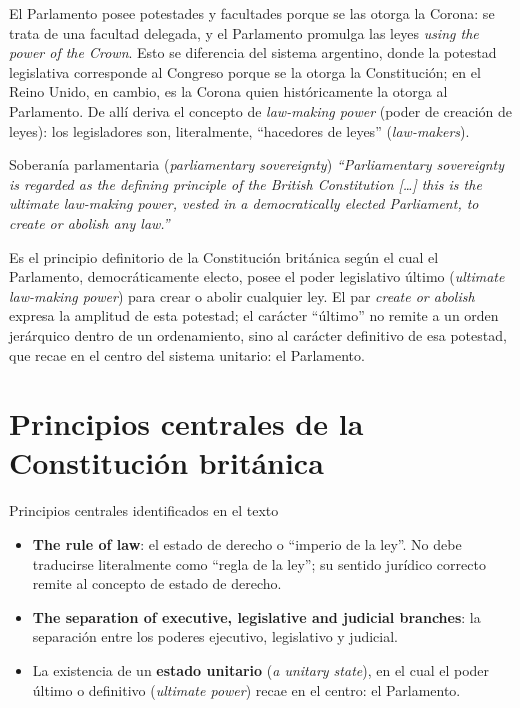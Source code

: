 \documentclass[12pt,oneside]{book}
\begin{document}
El Parlamento posee potestades y facultades porque se las otorga la Corona: se trata de una facultad delegada, y el Parlamento promulga las leyes \emph{using the power of the Crown}. Esto se diferencia del sistema argentino, donde la potestad legislativa corresponde al Congreso porque se la otorga la Constitución; en el Reino Unido, en cambio, es la Corona quien históricamente la otorga al Parlamento. De allí deriva el concepto de \emph{law-making power} (poder de creación de leyes): los legisladores son, literalmente, ``hacedores de leyes'' (\emph{law-makers}).

\begin{definition}{Soberanía parlamentaria (\emph{parliamentary sovereignty})}
\emph{``Parliamentary sovereignty is regarded as the defining principle of the British Constitution [\ldots] this is the ultimate law-making power, vested in a democratically elected Parliament, to create or abolish any law.''}

Es el principio definitorio de la Constitución británica según el cual el Parlamento, democráticamente electo, posee el poder legislativo último (\emph{ultimate law-making power}) para crear o abolir cualquier ley. El par \emph{create or abolish} expresa la amplitud de esta potestad; el carácter ``último'' no remite a un orden jerárquico dentro de un ordenamiento, sino al carácter definitivo de esa potestad, que recae en el centro del sistema unitario: el Parlamento.
\end{definition}

\section{Principios centrales de la Constitución británica}

\begin{definition}{Principios centrales identificados en el texto}
\begin{itemize}
    \item \textbf{The rule of law}: el estado de derecho o ``imperio de la ley''. No debe traducirse literalmente como ``regla de la ley''; su sentido jurídico correcto remite al concepto de estado de derecho.
    \item \textbf{The separation of executive, legislative and judicial branches}: la separación entre los poderes ejecutivo, legislativo y judicial.
    \item La existencia de un \textbf{estado unitario} (\emph{a unitary state}), en el cual el poder último o definitivo (\emph{ultimate power}) recae en el centro: el Parlamento.
\end{itemize}
\end{definition}
\end{document}
